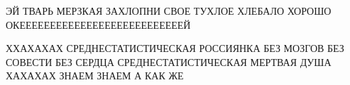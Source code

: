 ЭЙ ТВАРЬ МЕРЗКАЯ ЗАХЛОПНИ СВОЕ ТУХЛОЕ ХЛЕБАЛО ХОРОШО
ОКЕЕЕЕЕЕЕЕЕЕЕЕЕЕЕЕЕЕЕЕЕЕЕЕЕЕЕЙ



ХХАХАХАХ СРЕДНЕСТАТИСТИЧЕСКАЯ РОССИЯНКА БЕЗ МОЗГОВ БЕЗ СОВЕСТИ БЕЗ СЕРДЦА
СРЕДНЕСТАТИСТИЧЕСКАЯ МЕРТВАЯ ДУША ХАХАХАХ ЗНАЕМ ЗНАЕМ А КАК ЖЕ
















